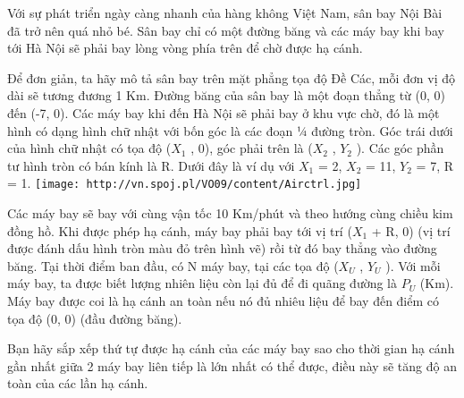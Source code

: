 Với sự phát triển ngày càng nhanh của hàng không Việt Nam, sân bay Nội Bài đã trở nên quá nhỏ bé. Sân bay chỉ có một đường băng và các máy bay khi bay tới Hà Nội sẽ phải bay lòng vòng phía trên để chờ được hạ cánh.  

   Để đơn giản, ta hãy mô tả sân bay trên mặt phẳng tọa độ Đề Các, mỗi đơn vị độ dài sẽ tương đương 1 Km. Đường băng của sân bay là một đoạn thẳng từ (0, 0) đến (-7, 0). Các máy bay khi đến Hà Nội sẽ phải bay ở khu vực chờ, đó là một hình có dạng hình chữ nhật với bốn góc là các đoạn ¼ đường tròn. Góc trái dưới của hình chữ nhật có tọa độ ($X_{1}$   , 0), góc phải trên là ($X_{2}$   , $Y_{2}$   ). Các góc phần tư hình tròn có bán kính là R. Dưới đây là ví dụ với $X_{1}$   = 2, $X_{2}$   = 11, $Y_{2}$   = 7, R = 1.  
\texttt{[image: http://vn.spoj.pl/VO09/content/Airctrl.jpg]}

   Các máy bay sẽ bay với cùng vận tốc 10 Km/phút và theo hướng cùng chiều kim đồng hồ. Khi được phép hạ cánh, máy bay phải bay tới vị trí ($X_{1}$   + R, 0) (vị trí được đánh dấu hình tròn màu đỏ trên hình vẽ) rồi từ đó bay thẳng vào đường băng. Tại thời điểm ban đầu, có N máy bay, tại các tọa độ ($X_{U}$   , $Y_{U}$   ). Với mỗi máy bay, ta được biết lượng nhiên liệu còn lại đủ để đi quãng đường là $P_{U}$   (Km). Máy bay được coi là hạ cánh an toàn nếu nó đủ nhiêu liệu để bay đến điểm có tọa độ (0, 0) (đầu đường băng).  

   Bạn hãy sắp xếp thứ tự được hạ cánh của các máy bay sao cho thời gian hạ cánh gần nhất giữa 2 máy bay liên tiếp là lớn nhất có thể được, điều này sẽ tăng độ an toàn của các lần hạ cánh.